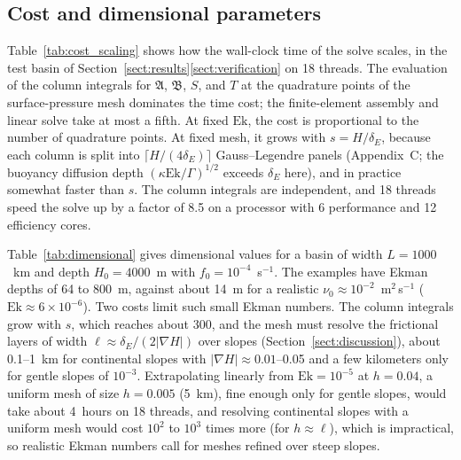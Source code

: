 \documentclass{ametsocV6.2}
\begin{document}
\subsection{Cost and dimensional parameters}
\label{sect:cost}

Table~\ref{tab:cost_scaling} shows how the wall-clock time of the solve scales, in the test basin of Section~\ref{sect:results}\ref{sect:verification} on 18 threads.
The evaluation of the column integrals for $\mathfrak{A}$, $\mathfrak{B}$, $S$, and $T$ at the quadrature points of the surface-pressure mesh dominates the time cost; the finite-element assembly and linear solve take at most a fifth.
At fixed $\mathrm{Ek}$, the cost is proportional to the number of quadrature points.
At fixed mesh, it grows with $s = H/\delta_E$, because each column is split into $\lceil H/(4\delta_E) \rceil$ Gauss--Legendre panels (Appendix~C; the buoyancy diffusion depth $(\kappa \mathrm{Ek}/\Gamma)^{1/2}$ exceeds $\delta_E$ here), and in practice somewhat faster than $s$.
The column integrals are independent, and 18 threads speed the solve up by a factor of 8.5 on a processor with 6 performance and 12 efficiency cores.

Table~\ref{tab:dimensional} gives dimensional values for a basin of width $L = 1000$~km and depth $H_0 = 4000$~m with $f_0 = 10^{-4}$~s$^{-1}$.
The examples have Ekman depths of 64 to 800~m, against about 14~m for a realistic $\nu_0 \approx 10^{-2}$~m$^2$\,s$^{-1}$ ($\mathrm{Ek} \approx 6 \times 10^{-6}$).
Two costs limit such small Ekman numbers.
The column integrals grow with $s$, which reaches about 300, and the mesh must resolve the frictional layers of width $\ell \approx \delta_E/(2|\nabla H|)$ over slopes (Section~\ref{sect:discussion}), about 0.1--1~km for continental slopes with $|\nabla H| \approx 0.01$--0.05 and a few kilometers only for gentle slopes of $10^{-3}$.
Extrapolating linearly from $\mathrm{Ek} = 10^{-5}$ at $h = 0.04$, a uniform mesh of size $h = 0.005$ (5~km), fine enough only for gentle slopes, would take about 4~hours on 18 threads, and resolving continental slopes with a uniform mesh would cost $10^2$ to $10^3$ times more (for $h \approx \ell$), which is impractical, so realistic Ekman numbers call for meshes refined over steep slopes.
\end{document}
